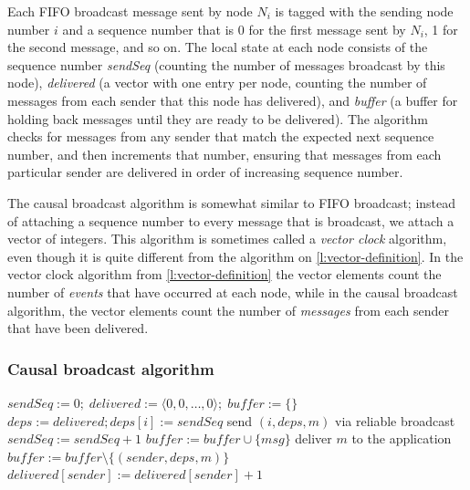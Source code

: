 Each FIFO broadcast message sent by node $N_i$ is tagged with the sending node number $i$ and a sequence number that is 0 for the first message sent by $N_i$, 1 for the second message, and so on.
The local state at each node consists of the sequence number \emph{sendSeq} (counting the number of messages broadcast by this node), \emph{delivered} (a vector with one entry per node, counting the number of messages from each sender that this node has delivered), and \emph{buffer} (a buffer for holding back messages until they are ready to be delivered).
The algorithm checks for messages from any sender that match the expected next sequence number, and then increments that number, ensuring that messages from each particular sender are delivered in order of increasing sequence number.

The causal broadcast algorithm is somewhat similar to FIFO broadcast; instead of attaching a sequence number to every message that is broadcast, we attach a vector of integers.
This algorithm is sometimes called a \emph{vector clock} algorithm, even though it is quite different from the algorithm on \autoref{l:vector-definition}.
In the vector clock algorithm from \autoref{l:vector-definition} the vector elements count the number of \emph{events} that have occurred at each node, while in the causal broadcast algorithm, the vector elements count the number of \emph{messages} from each sender that have been delivered.

\begin{frame}
    \label{s:causal-algorithm}
    \frametitle{Causal broadcast algorithm}
    \footnotesize
    \begin{algorithmic}
            \State $\mathit{sendSeq} := 0;\; \mathit{delivered} := \langle 0, 0, \dots, 0 \rangle;\; \mathit{buffer} := \{\}$
        \EndOn
        \State
            \State $\mathit{deps} := \mathit{delivered}; \mathit{deps}[i] := sendSeq$
            \State send $(i, \mathit{deps}, m)$ via reliable broadcast
            \State $\mathit{sendSeq} := \mathit{sendSeq} + 1$
        \EndOn
        \State
            \State $\mathit{buffer} := \mathit{buffer} \cup \{\mathit{msg}\}$
                \State deliver $m$ to the application
                \State $\mathit{buffer} := \mathit{buffer} \setminus \{(\mathit{sender}, \mathit{deps}, m)\}$
                \State $\mathit{delivered}[\mathit{sender}] := \mathit{delivered}[\mathit{sender}] + 1$
            \EndWhile
        \EndOn
    \end{algorithmic}
\end{frame}
\label{l:causal-algorithm}


